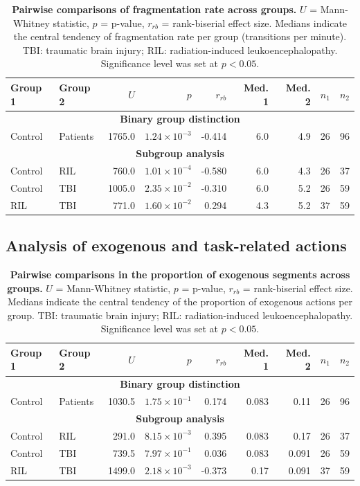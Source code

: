 \documentclass[runningheads]{llncs}
\begin{document}
\begin{table}[!htbp]
\centering
\begin{tabular}{l l r r r r r r r}
\hline
Group 1 & Group 2 & $U$ & $p$ & $r_{rb}$ & Med. 1 & Med. 2 & $n_1$ & $n_2$ \\
\hline
\multicolumn{9}{c}{\textbf{Binary group distinction}} \\
\hline
Control & Patients & 1765.0 & $1.24 \times 10^{-3}$ & -0.414 & 6.0 & 4.9 & 26 & 96 \\
\hline
\multicolumn{9}{c}{\textbf{Subgroup analysis}} \\
\hline
Control & RIL & 760.0  & $1.01 \times 10^{-4}$ & -0.580 & 6.0 & 4.3 & 26 & 37 \\
Control & TBI & 1005.0 & $2.35 \times 10^{-2}$ & -0.310 & 6.0 & 5.2 & 26 & 59 \\
RIL     & TBI & 771.0  & $1.60 \times 10^{-2}$ &  0.294 & 4.3 & 5.2 & 37 & 59 \\
\hline
\end{tabular}
\caption{\textbf{Pairwise comparisons of fragmentation rate across groups.} $U$ = Mann-Whitney statistic, $p$ = p-value, $r_{rb}$ = rank-biserial effect size. Medians indicate the central tendency of fragmentation rate per group (transitions per minute). TBI: traumatic brain injury; RIL: radiation-induced leukoencephalopathy. Significance level was set at $p<0.05$.}
\label{tab:fragmentation_results}
\end{table}

\subsection{Analysis of exogenous and task-related actions}

\begin{table}[!htbp]
\centering
\begin{tabular}{l l r r r r r r r}
\hline
Group 1 & Group 2 & $U$ & $p$ & $r_{rb}$ & Med. 1 & Med. 2 & $n_1$ & $n_2$ \\
\hline
\multicolumn{9}{c}{\textbf{Binary group distinction}} \\
\hline
Control & Patients & 1030.5 & $1.75 \times 10^{-1}$ &  0.174 & 0.083 & 0.11 & 26 & 96 \\
\hline
\multicolumn{9}{c}{\textbf{Subgroup analysis}} \\
\hline
Control & RIL & 291.0  & $8.15 \times 10^{-3}$ &  0.395 & 0.083 & 0.17 & 26 & 37 \\
Control & TBI & 739.5  & $7.97 \times 10^{-1}$ &  0.036 & 0.083 & 0.091 & 26 & 59 \\
RIL     & TBI & 1499.0 & $2.18 \times 10^{-3}$ & -0.373 & 0.17  & 0.091 & 37 & 59 \\
\hline
\end{tabular}
\caption{\textbf{Pairwise comparisons in the proportion of exogenous segments across groups.} $U$ = Mann-Whitney statistic, $p$ = p-value, $r_{rb}$ = rank-biserial effect size. Medians indicate the central tendency of the proportion of exogenous actions per group. TBI: traumatic brain injury; RIL: radiation-induced leukoencephalopathy. Significance level was set at $p<0.05$.}
\label{tab:task_exo_results}
\end{table}
\end{document}
